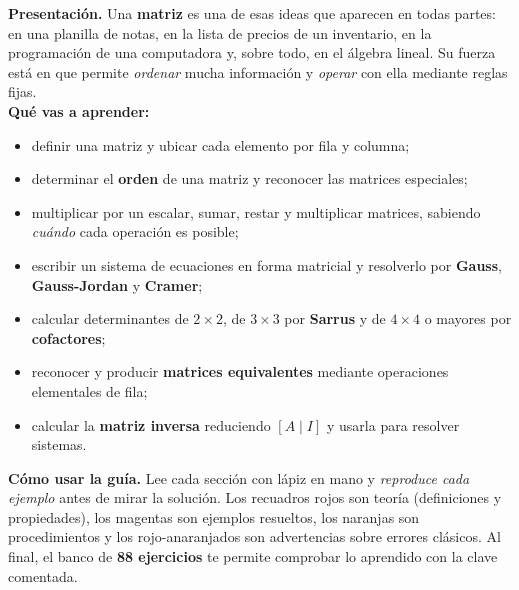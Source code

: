 \documentclass[12pt, letterpaper]{article}
\begin{document}

\renewcommand{\arraystretch}{1.15}

\renewcommand{\facil}{{\color{mwnaranja}$\bigstar\!\!$}\hspace{2pt}}
\renewcommand{\medio}{{\color{mwrojonaranja}$\bigstar\!\bigstar\!\!$}\hspace{2pt}}
\renewcommand{\dificil}{{\color{mwprimario}$\bigstar\!\bigstar\!\bigstar\!\!$}\hspace{2pt}}


\vspace{4pt}
\begin{cuadroinfo}
  \small
  \textbf{Presentación.} Una \textbf{matriz} es una de esas ideas que
  aparecen en todas partes: en una planilla de notas, en la lista de precios
  de un inventario, en la programación de una computadora y, sobre todo, en
  el álgebra lineal. Su fuerza está en que permite \emph{ordenar} mucha
  información y \emph{operar} con ella mediante reglas fijas.
  \\[4pt]
  \textbf{Qué vas a aprender:}
  \begin{itemize}[leftmargin=1.2em, nosep, topsep=2pt]
    \item definir una matriz y ubicar cada elemento por fila y columna;
    \item determinar el \textbf{orden} de una matriz y reconocer las matrices
          especiales;
    \item multiplicar por un escalar, sumar, restar y multiplicar matrices,
          sabiendo \emph{cuándo} cada operación es posible;
    \item escribir un sistema de ecuaciones en forma matricial y resolverlo
          por \textbf{Gauss}, \textbf{Gauss-Jordan} y \textbf{Cramer};
    \item calcular determinantes de $2\times2$, de $3\times3$ por
          \textbf{Sarrus} y de $4\times4$ o mayores por \textbf{cofactores};
    \item reconocer y producir \textbf{matrices equivalentes} mediante
          operaciones elementales de fila;
    \item calcular la \textbf{matriz inversa} reduciendo $[A\mid I]$ y usarla
          para resolver sistemas.
  \end{itemize}
  \par\medskip
  \textbf{Cómo usar la guía.} Lee cada sección con lápiz en mano y \emph{reproduce
  cada ejemplo} antes de mirar la solución. Los recuadros rojos son teoría
  (definiciones y propiedades), los magentas son ejemplos resueltos, los
  naranjas son procedimientos y los rojo-anaranjados son advertencias sobre
  errores clásicos. Al final, el banco de \textbf{88 ejercicios} te permite
  comprobar lo aprendido con la clave comentada.
\end{cuadroinfo}
\end{document}
